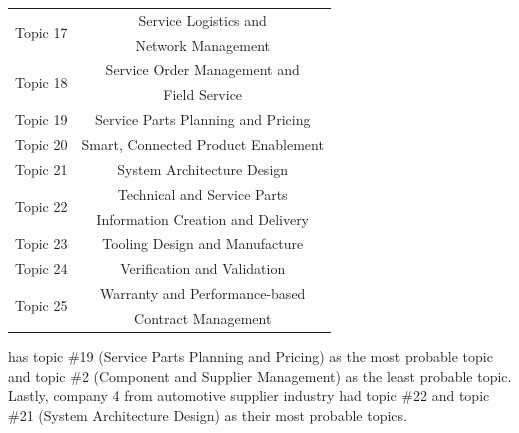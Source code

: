 \documentclass[10pt, conference, compsocconf]{IEEEtran}
\begin{document}
\begin{table}[h]
{\begin{tabular}{|c|c|}
\hline
\multirow{2}{*}{Topic 17}&Service Logistics and\\
&Network Management \\
\hline
\multirow{2}{*}{Topic 18}&Service Order Management and\\
&Field Service \\
\hline
Topic 19&Service Parts Planning and Pricing \\
\hline
Topic 20&Smart, Connected Product Enablement \\
\hline
Topic 21&System Architecture Design \\
\hline
\multirow{2}{*}{Topic 22}&Technical and Service Parts \\
&Information Creation and Delivery\\
\hline
Topic 23&Tooling Design and Manufacture \\
\hline
Topic 24&Verification and Validation \\
\hline
\multirow{2}{*}{Topic 25}&Warranty and Performance-based \\
&Contract Management\\
\hline
\end{tabular}}
\end{table}has topic \#19 (Service Parts Planning and Pricing) as the most probable topic and topic \#2 (Component and Supplier Management) as the least probable topic. Lastly, company 4 from automotive supplier industry had topic \#22 and topic \#21 (System Architecture Design) as their most probable topics.


%
\end{document}

